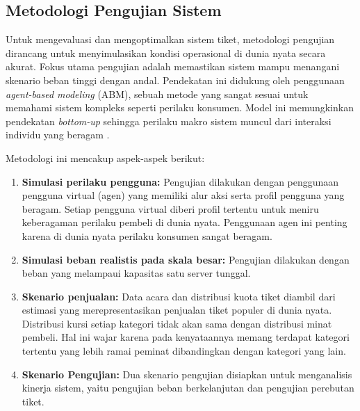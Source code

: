 \subsection{Metodologi Pengujian Sistem}

Untuk mengevaluasi dan mengoptimalkan sistem tiket, metodologi pengujian dirancang untuk menyimulasikan kondisi operasional di dunia nyata secara akurat. Fokus utama pengujian adalah memastikan sistem mampu menangani skenario beban tinggi dengan andal. Pendekatan ini didukung oleh penggunaan \textit{agent-based modeling} (ABM), sebuah metode yang sangat sesuai untuk memahami sistem kompleks seperti perilaku konsumen. Model ini memungkinkan pendekatan \textit{bottom-up} sehingga perilaku makro sistem muncul dari interaksi individu yang beragam \parencite{agentModelling}.

Metodologi ini mencakup aspek-aspek berikut:

\begin{enumerate}
    \item \textbf{Simulasi perilaku pengguna:} Pengujian dilakukan dengan penggunaan pengguna virtual (agen) yang memiliki alur aksi serta profil pengguna yang beragam. Setiap pengguna virtual diberi profil tertentu untuk meniru keberagaman perilaku pembeli di dunia nyata.  Penggunaan agen ini penting karena di dunia nyata perilaku konsumen sangat beragam.
    \item \textbf{Simulasi beban realistis pada skala besar:} Pengujian dilakukan dengan beban yang melampaui kapasitas satu server tunggal.
    \item \textbf{Skenario penjualan:} Data acara dan distribusi kuota tiket diambil dari estimasi yang merepresentasikan penjualan tiket populer di dunia nyata. Distribusi kursi setiap kategori tidak akan sama dengan distribusi minat pembeli. Hal ini wajar karena pada kenyataannya memang terdapat kategori tertentu yang lebih ramai peminat dibandingkan dengan kategori yang lain.
    \item \textbf{Skenario Pengujian:} Dua skenario pengujian disiapkan untuk menganalisis kinerja sistem, yaitu pengujian beban berkelanjutan dan pengujian perebutan tiket.
\end{enumerate}

